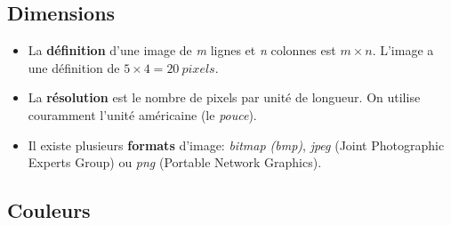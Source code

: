 \documentclass[a4paper,11pt]{article}
\begin{document}
\subsection{Dimensions}
\begin{center}
    \label{matrice}
\end{center}
\begin{itemize}
    \item La \textbf{définition} d'une image de \emph{m} lignes et \emph{n} colonnes est $m×n$. L'image a une définition de $5×4=20~pixels$.
    \item La \textbf{résolution} est le nombre de pixels par unité de longueur. On utilise couramment l'unité américaine (le \emph{pouce}).
    \item Il existe plusieurs \textbf{formats} d'image: \emph{bitmap (bmp)}, \emph{jpeg} (Joint Photographic Experts Group) ou \emph{png} (Portable Network Graphics).
\end{itemize}
\subsection{Couleurs}
\end{document}
